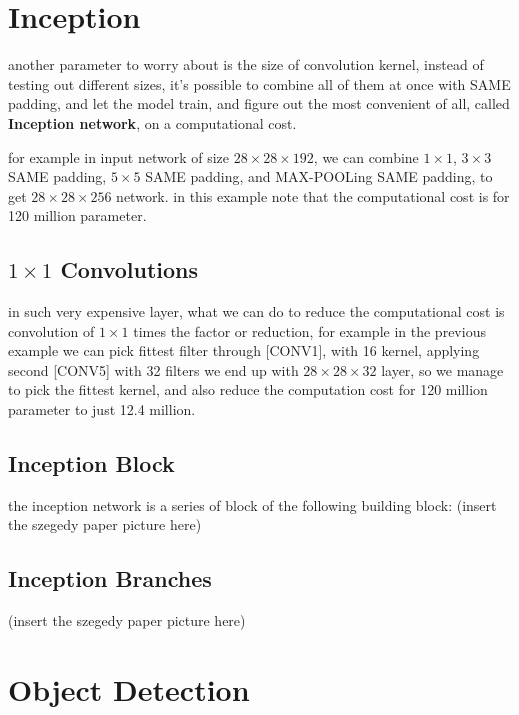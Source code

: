 \documentclass[4apaper,12pt]{book}
\begin{document}
  \section{Inception}
  \begin{description}
  \item another parameter to worry about is the size of convolution kernel, instead of testing out different sizes, it's possible to combine all of them at once with SAME padding, and let the model train, and figure out the most convenient of all, called \textbf{Inception network}, on a computational cost.
  \item for example in input network of size $28\times{28}\times{192}$, we can combine $1\times{1}$, $3\times{3}$ SAME padding, $5\times{5}$ SAME padding, and MAX-POOLing SAME padding, to get $28\times{28}\times{256}$ network. in this example note that the computational cost is for 120 million parameter.
    \subsection{$1\times{1}$ Convolutions}
    \begin{description}
    \item in such very expensive layer, what we can do to reduce the computational cost is convolution of $1\times{1}$ times the factor or reduction, for example in the previous example we can pick fittest filter through [CONV1], with 16 kernel, applying second [CONV5] with 32 filters we end up with $28\times{28}\times{32}$ layer, so we manage to pick the fittest kernel, and also reduce the computation cost for 120 million parameter to just 12.4 million.
      \item
    \end{description}
    \subsection{Inception Block}
    \begin{description}
    \item the inception network is a series of block of the following building block: (insert the szegedy paper picture here)
    \end{description}
    \subsection{Inception Branches}
    \item (insert the szegedy paper picture here)
      \section{Object Detection}

\end{description}
\end{document}
